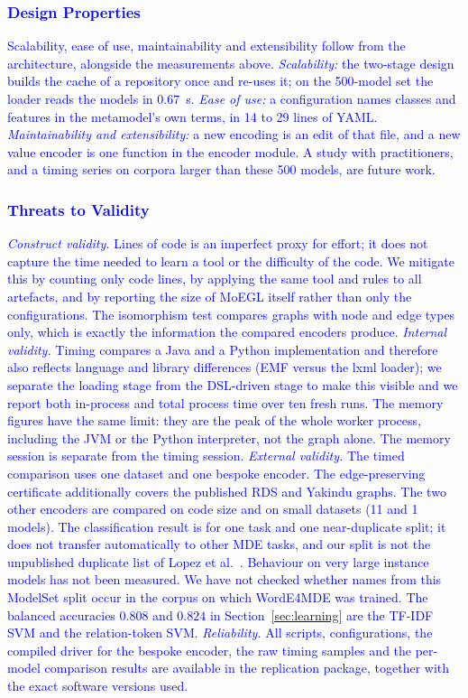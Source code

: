 \documentclass[journal,article,submit,moreauthors,technologies]{Definitions/mdpi}
\newcommand{\rev}[1]{\textcolor{blue}{#1}}
\begin{document}
\subsubsection{\rev{Design Properties}}

\rev{Scalability, ease of use, maintainability and extensibility follow from the architecture, alongside the measurements above. \emph{Scalability:} the two-stage design builds the cache of a repository once and re-uses it; on the 500-model set the loader reads the models in $0.67$~s. \emph{Ease of use:} a configuration names classes and features in the metamodel's own terms, in 14 to 29 lines of YAML. \emph{Maintainability and extensibility:} a new encoding is an edit of that file, and a new value encoder is one function in the encoder module. A study with practitioners, and a timing series on corpora larger than these 500 models, are future work.}

\subsubsection{\rev{Threats to Validity}}

\rev{\emph{Construct validity.} Lines of code is an imperfect proxy for effort; it does not capture the time needed to learn a tool or the difficulty of the code. We mitigate this by counting only code lines, by applying the same tool and rules to all artefacts, and by reporting the size of MoEGL itself rather than only the configurations. The isomorphism test compares graphs with node and edge types only, which is exactly the information the compared encoders produce. \emph{Internal validity.} Timing compares a Java and a Python implementation and therefore also reflects language and library differences (EMF versus the lxml loader); we separate the loading stage from the DSL-driven stage to make this visible and we report both in-process and total process time over ten fresh runs. The memory figures have the same limit: they are the peak of the whole worker process, including the JVM or the Python interpreter, not the graph alone. The memory session is separate from the timing session. \emph{External validity.} The timed comparison uses one dataset and one bespoke encoder. The edge-preserving certificate additionally covers the published RDS and Yakindu graphs. The two other encoders are compared on code size and on small datasets (11 and 1 models). The classification result is for one task and one near-duplicate split; it does not transfer automatically to other MDE tasks, and our split is not the unpublished duplicate list of Lopez et al.~\cite{lopez2022classification}. Behaviour on very large instance models has not been measured. We have not checked whether names from this ModelSet split occur in the corpus on which WordE4MDE was trained. The balanced accuracies $0.808$ and $0.824$ in Section~\ref{sec:learning} are the TF-IDF SVM and the relation-token SVM. \emph{Reliability.} All scripts, configurations, the compiled driver for the bespoke encoder, the raw timing samples and the per-model comparison results are available in the replication package, together with the exact software versions used.}
\end{document}

